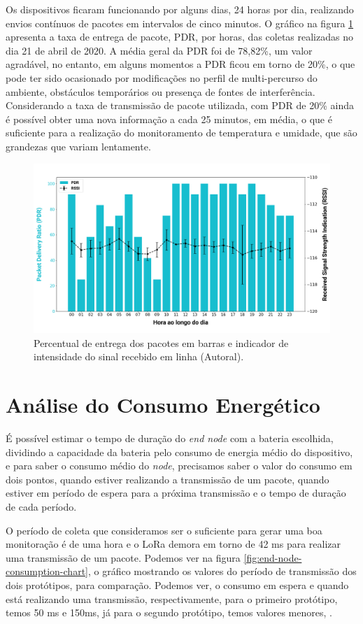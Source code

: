 Os dispositivos ficaram funcionando por alguns dias, 24 horas por dia, realizando envios contínuos de pacotes em intervalos de cinco minutos. O gráfico na figura \ref{fig:21-04-2020-pdr-rssi} apresenta a taxa de entrega de pacote, PDR, por horas, das coletas realizadas no dia 21 de abril de 2020. A média geral da PDR foi de 78,82\%, um valor agradável, no entanto, em alguns momentos a PDR ficou em torno de 20\%, o que pode ter sido ocasionado por modificações no perfil de multi-percurso do ambiente, obstáculos temporários ou presença de fontes de interferência. Considerando a taxa de transmissão de pacote utilizada, com PDR de 20\% ainda é possível obter uma nova informação a cada 25 minutos, em média, o que é suficiente para a realização do monitoramento de temperatura e umidade, que são grandezas que variam lentamente.

\begin{figure}[H]
  \centering
  \includegraphics[width=.80\textwidth]{assets/21-04-2020-pdr-rssi.png} 
  \caption{Percentual de entrega dos pacotes em barras e indicador de intensidade do sinal recebido em linha (Autoral).}
  \label{fig:21-04-2020-pdr-rssi} 
\end{figure}

\section{Análise do Consumo Energético}
\label{result:consumo}
É possível estimar o tempo de duração do \textit{end node} com a bateria escolhida, dividindo a capacidade da bateria pelo consumo de energia médio do dispositivo, e para saber o consumo médio do \textit{node}, precisamos saber o valor do consumo em dois pontos, quando estiver realizando a transmissão de um pacote, quando estiver em período de espera para a próxima transmissão e o tempo de duração de cada período.

O período de coleta que consideramos ser o suficiente para gerar uma boa monitoração é de uma hora e o LoRa demora em torno de 42 ms para realizar uma transmissão de um pacote. Podemos ver na figura \ref{fig:end-node-consumption-chart}, o gráfico mostrando os valores do período de transmissão dos dois protótipos, para comparação. Podemos ver, o consumo em espera e quando está realizando uma transmissão, respectivamente, para o primeiro protótipo, temos 50 ms e 150ms, já para o segundo protótipo, temos valores menores, .

